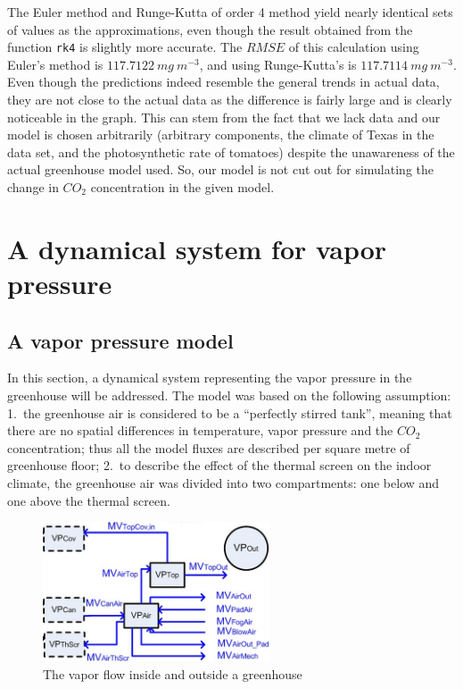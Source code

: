 \documentclass[a4paper]{article}
\numberwithin{equation}{section}
\begin{document}
The Euler method and Runge-Kutta of order 4 method yield nearly identical sets of values as the approximations, even though the result obtained from the function \texttt{rk4} is slightly more accurate. The \( RMSE \) of this calculation using Euler's method is \( 117.7122\ mg\ m^{-3} \), and using Runge-Kutta's is \( 117.7114\ mg\ m^{-3} \). Even though the predictions indeed resemble the general trends in actual data, they are not close to the actual data as the difference is fairly large and is clearly noticeable in the graph. This can stem from the fact that we lack data and our model is chosen arbitrarily (arbitrary components, the climate of Texas in the data set, and the photosynthetic rate of tomatoes) despite the unawareness of the actual greenhouse model used. So, our model is not cut out for simulating the change in \( CO_2 \) concentration in the given model.

\newpage
\section{A dynamical system for vapor pressure}
\subsection{A vapor pressure model}
In this section, a dynamical system representing the vapor pressure in the greenhouse will be addressed.
The model was based on the following assumption:
1.\ the greenhouse air is considered to be a ``perfectly stirred tank'', meaning that there are no spatial differences in temperature, vapor pressure and the \( CO_2 \) concentration; thus all the model fluxes are described per square metre of greenhouse floor;
2.\ to describe the effect of the thermal screen on the indoor climate, the greenhouse air was divided into two compartments: one below and one above the thermal screen.

\begin{figure}[H]
  \centering
  \includegraphics[width=0.6\textwidth]{VP}
  \caption{The vapor flow inside and outside a greenhouse}\label{fig:VP}
\end{figure}
\end{document}
